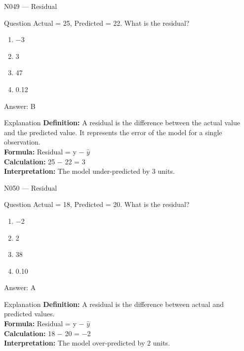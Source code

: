 \documentclass[aspectratio=169,8pt]{beamer}
\begin{document}
	\begin{frame}{N049 --- Residual}
		\begin{block}{Question}
			Actual = 25, Predicted = 22. What is the residual?
			\begin{enumerate}
				\item $-$3
				\item 3
				\item 47
				\item 0.12
			\end{enumerate}
		\end{block}
		\begin{exampleblock}{Answer: B}\end{exampleblock}
		\begin{block}{Explanation}
			\textbf{Definition:} A residual is the difference between the actual value and the predicted value. It represents the error of the model for a single observation.\\
			\textbf{Formula:} Residual = y $-$ $\hat{y}$\\
			\textbf{Calculation:} 25 $-$ 22 = 3\\
			\textbf{Interpretation:} The model under-predicted by 3 units.
		\end{block}
	\end{frame}
	
	\begin{frame}{N050 --- Residual}
		\begin{block}{Question}
			Actual = 18, Predicted = 20. What is the residual?
			\begin{enumerate}
				\item $-$2
				\item 2
				\item 38
				\item 0.10
			\end{enumerate}
		\end{block}
		\begin{exampleblock}{Answer: A}\end{exampleblock}
		\begin{block}{Explanation}
			\textbf{Definition:} A residual is the difference between actual and predicted values.\\
			\textbf{Formula:} Residual = y $-$ $\hat{y}$\\
			\textbf{Calculation:} 18 $-$ 20 = $-$2\\
			\textbf{Interpretation:} The model over-predicted by 2 units.
		\end{block}
	\end{frame}
	
\end{document}
